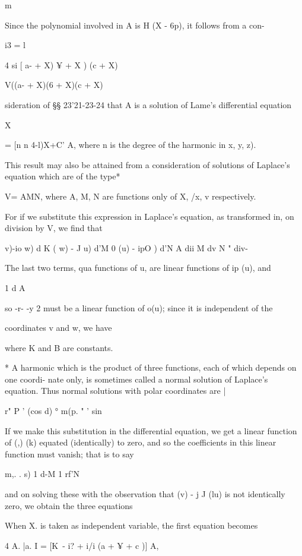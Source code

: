 {{{m

Since the polynomial involved in A is H (X - 6p), it follows from a
con-

i3 = l

4 si [ a- + X) ¥ + X ) (c + X)

V((a- + X)(6 + X)(c + X)

sideration of §§ 23'21-23-24 that A is a solution of Lame's
differential equation

X

= [n n 4-l)X+C' A, where n is the degree of the harmonic in x, y, z).

This result may also be attained from a consideration of solutions of
Laplace's equation which are of the type*

V= AMN, where A, M, N are functions only of X, /x, v respectively.

For if we substitute this expression in Laplace's equation, as
transformed in, on division by V, we find that

  v)-io w) d K ( w) - J u) d'M 0 (u) - ipO ) d'N A dii M dv N " div-

The last two terms, qua functions of u, are linear functions of ip
(u), and

1 d A

so -r- -y 2 must be a linear function of o(u); since it is independent
of the

coordinates v and w, we have

where K and B are constants.

* A harmonic which is the product of three functions, each of which
depends on one coordi- nate only, is sometimes called a normal
solution of Laplace's equation. Thus normal solutions with polar
coordinates are |

r" P ' (cos d) ° m(p. " ' sin

%
%

If we make this substitution in the differential equation, we get a
linear function of (,) (k) equated (identically) to zero, and so the
coefficients in this linear function must vanish; that is to say

m,. . s) 1 d-M 1 rf'N

and on solving these with the observation that (v) - j J (lu) is not
identically zero, we obtain the three equations

When X. is taken as independent variable, the first equation becomes

4 A. |a. I = [K\ - i? + i/i (a + ¥ + c )] A,

}}}
